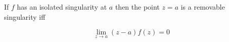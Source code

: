 If $f$ has an isolated singularity at $a$ then the point $z = a$ is a removable singularity iff

$$\lim_{z \to a} (z - a)f(z) = 0$$